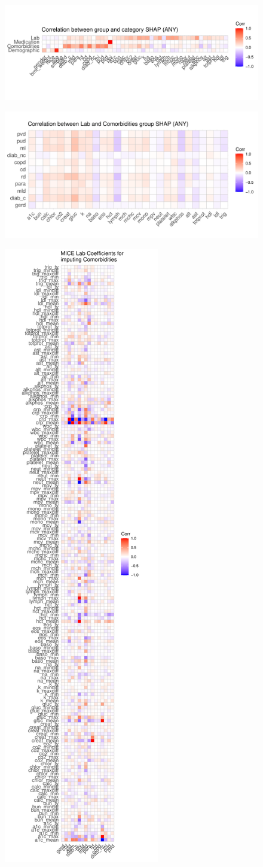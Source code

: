 \documentclass[english]{article}
\begin{document}
\begin{figure}[ht]
\includegraphics[width=1.0\linewidth]{variable_importance/shap_corr_groups_categories_ANY.pdf}
\end{figure}

\begin{figure}[ht]
\includegraphics[width=1.0\linewidth]{variable_importance/shap_corr_lab_comorbidities_ANY.pdf}
\end{figure}


\begin{figure}[ht]
\includegraphics[width=0.3\linewidth]{variable_importance/mice_comorbidities_lab.pdf}
\end{figure}
\end{document}

